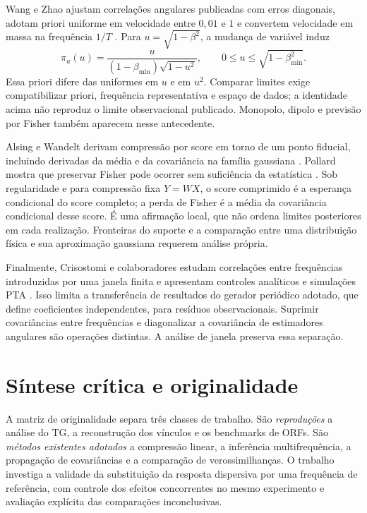 Wang e Zhao ajustam correlações angulares publicadas com erros
diagonais, adotam priori uniforme em velocidade entre $0{,}01$ e $1$
e convertem velocidade em massa na frequência $1/T$
\autocite{wang2024graviton}. Para $u=\sqrt{1-\beta^2}$,
a mudança de variável induz
\begin{equation}
 \pi_u(u)=\frac{u}{(1-\beta_{\min})\sqrt{1-u^2}},
 \qquad 0\leq u\leq\sqrt{1-\beta_{\min}^2}.
\end{equation}
Essa priori difere das uniformes em $u$ e em $u^2$. Comparar limites
exige compatibilizar priori, frequência representativa e espaço de
dados; a identidade acima não reproduz o limite observacional publicado.
Monopolo, dipolo e previsão por Fisher também aparecem nesse antecedente.

Alsing e Wandelt derivam compressão por score em torno de um ponto
fiducial, incluindo derivadas da média e da covariância na família
gaussiana \autocite{alsing2018compression}. Pollard mostra que preservar
Fisher pode ocorrer sem suficiência da estatística
\autocite{pollard2012fisher}. Sob regularidade e para compressão fixa
$Y=W X$, o score comprimido é a esperança condicional do score completo;
a perda de Fisher é a média da covariância condicional desse score.
É uma afirmação local, que não ordena limites posteriores em cada
realização. Fronteiras do suporte e a comparação entre uma distribuição
física e sua aproximação gaussiana requerem análise própria.

Finalmente, Crisostomi e colaboradores estudam correlações entre
frequências introduzidas por uma janela finita e apresentam controles
analíticos e simulações PTA \autocite{crisostomi2025covariance}.
Isso limita a transferência de resultados do gerador periódico adotado,
que define coeficientes independentes, para resíduos observacionais.
Suprimir covariâncias entre frequências e diagonalizar a covariância
de estimadores angulares são operações distintas. A análise de janela
preserva essa separação.

\section{Síntese crítica e originalidade}

A matriz de originalidade separa três classes de trabalho. São
\emph{reproduções} a análise do TG, a reconstrução dos vínculos e os
benchmarks de ORFs. São \emph{métodos existentes adotados} a
compressão linear, a inferência multifrequência, a propagação de
covariâncias e a comparação de verossimilhanças. O trabalho investiga a validade da substituição da resposta dispersiva
por uma frequência de referência, com controle dos efeitos concorrentes
no mesmo experimento e avaliação explícita das comparações inconclusivas.

